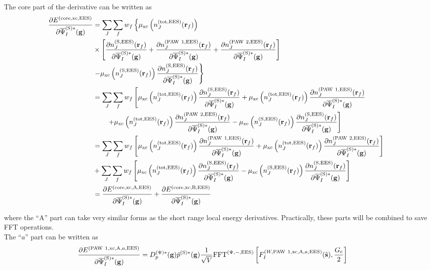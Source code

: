 \documentclass[paper=a4, fontsize=11pt]{article} %
\numberwithin{equation}{section} %
\numberwithin{figure}{section} %
\numberwithin{table}{section} %
\newcommand{\p}{\partial}
\newcommand{\bg}{{\bf{g}}}
\newcommand{\br}{{\bf{r}}}
\newcommand{\hs}{{\hat{\bf{s}}}}
\newcommand{\rS}{{\mathrm{S}}}
\newcommand{\rEES}{{\mathrm{EES}}}
\newcommand{\rxc}{{\mathrm{xc}}}
\newcommand{\rcore}{{\mathrm{core}}}
\newcommand{\rP}{{\mathrm{PAW}}}
\newcommand{\rA}{{\mathrm{A}}}
\newcommand{\rB}{{\mathrm{B}}}
\newcommand{\rtot}{{\mathrm{tot}}}
\newcommand{\psigsc}{{\overline \Psi_I^{(\rS)*}(\bg)}}
\newcommand{\hGc}{{\frac{G_{\mathrm{c}}}{2}}}
\newcommand{\Dpgc}{{D^{(\Psi)*}_p(\bg)}}
\newcommand{\FFTpiEES}{{\mathrm{FFT}^{(\Psi,-,\rEES)}}}
\begin{document}
The core part of the derivative can be written as
\begin{equation}\label{eq:dExccoredp}
\begin{split}
\frac{\p E^{(\rcore,\rxc,\rEES)}}{\p \psigsc}
&= \sum_J\sum_f w_f \left\{\mu_{\rxc}
\left(  n^{(\rtot,\rEES)}_J(\br_f)  \right) \right. \\
&\times \left[\frac{\p n^{(\rS,\rEES)}_J(\br_f)}{\p \psigsc} +\frac{\p n^{(\rP\ 1,\rEES)}_J(\br_f)}{\p \psigsc}+\frac{\p n^{(\rP\ 2,\rEES)}_J(\br_f)}{\p \psigsc}\right] \\
&\left. -\mu_{\rxc}\left(n_J^{(\rS,\rEES)}(\br_f)\right) \frac{\p n_J^{(\rS,\rEES)}(\br_f)}{\p \psigsc}  \right\} \\
&= \sum_J \sum_f w_f \left[\mu_{\rxc} \left(  n^{(\rtot,\rEES)}_J(\br_f)  \right) \frac{\p n^{(\rS,\rEES)}_J(\br_f)}{\p \psigsc} + \mu_{\rxc} \left( n^{(\rtot,\rEES)}_J(\br_f)  \right) \frac{\p n^{(\rP\ 1,\rEES)}_J(\br_f) }{\p \psigsc} \right. \\
&\left.\ \ \ \ \ \  + \mu_{\rxc} \left(  n^{(\rtot,\rEES)}_J(\br_f) \right) \frac{\p n^{(\rP\ 2,\rEES)}_J(\br_f) }{\p \psigsc} -\mu_{\rxc}\left(n_J^{(\rS,\rEES)}(\br_f)\right) \frac{\p n_J^{(\rS,\rEES)}(\br_f)}{\p \psigsc}  \right]\\
&= \sum_J \sum_f w_f \left[ \mu_{\rxc} \left( n^{(\rtot,\rEES)}_J(\br_f)  \right) \frac{\p n^{(\rP\ 1,\rEES)}_J(\br_f) }{\p \psigsc} + \mu_{\rxc} \left(  n^{(\rtot,\rEES)}_J(\br_f) \right) \frac{\p n^{(\rP\ 2,\rEES)}_J(\br_f) }{\p \psigsc}\right] \\
&+\sum_J \sum_f w_f  \left[ \mu_{\rxc}\left(  n^{(\rtot,\rEES)}_J(\br_f)  \right) \frac{\p n^{(\rS,\rEES)}_J(\br_f)}{\p \psigsc} -\mu_{\rxc}\left(n_J^{(\rS,\rEES)}(\br_f)\right) \frac{\p n_J^{(\rS,\rEES)}(\br_f)}{\p \psigsc}  \right]\\
& = \frac{\p E^{(\rcore,\rxc,\rA,\rEES)}}{\p \psigsc} + \frac{\p E^{(\rcore,\rxc,\rB,\rEES)}}{\p \psigsc}
\end{split}
\end{equation}

where the ``$\rA$'' part can take very similar forms as the short range local energy derivatives. Practically, these parts will be combined to save FFT operations.\\

The ``$a$'' part can be written as
\begin{equation}
\begin{split}
\frac{\p E^{(\rP\ 1,\rxc,\rA,a,\rEES)}}{\p \psigsc}
&= \Dpgc \tilde p^{(\rS)*}(\bg)\frac{1}{\sqrt{V}} \FFTpiEES \left[F_I^{(W,\rP\ 1,\rxc,\rA,a,\rEES)}(\hs),\hGc\right]
\end{split}
\end{equation}
\end{document}
